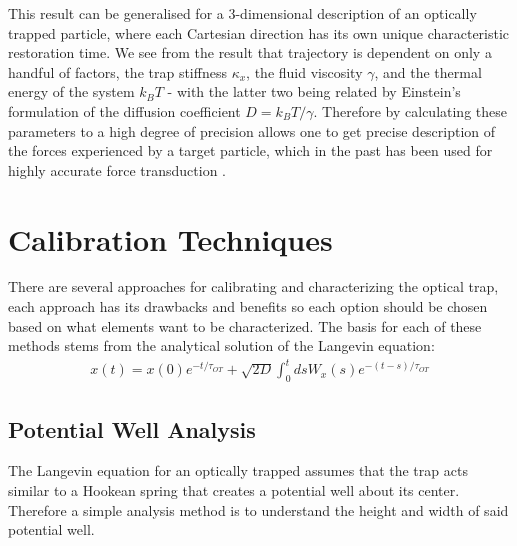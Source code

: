 This result can be generalised for a 3-dimensional description of an optically trapped particle, where each Cartesian direction has its own unique characteristic restoration time. We see from the result that trajectory is dependent on only a handful of factors, the trap stiffness $\kappa_x$, the fluid viscosity $\gamma$, and the thermal energy of the system $k_BT$ - with the latter two being related by Einstein's formulation of the diffusion coefficient $D = k_BT/\gamma$. Therefore by calculating these parameters to a high degree of precision allows one to get precise description of the forces experienced by a target particle, which in the past has been used for highly accurate force transduction \cite{BergSoerensen2004, Smith2003}.

\section{Calibration Techniques}
\label{sec:calibration_techniques}
There are several approaches for calibrating and characterizing the optical trap, each approach has its drawbacks and benefits so each option should be chosen based on what elements want to be characterized. The basis for each of these methods stems from the analytical solution of the Langevin equation:
\begin{align}
	\label{eq:anylitical_lang}
	x(t) = x(0)e^{-t/\tau_{OT}}+\sqrt{2D}\int^t_0dsW_x(s)e^{-(t-s)/\tau_{OT}}
\end{align}

\subsection{Potential Well Analysis}
The Langevin equation for an optically trapped assumes that the trap acts similar to a Hookean spring that creates a potential well about its center. Therefore a simple analysis method is to understand the height and width of said potential well. 

